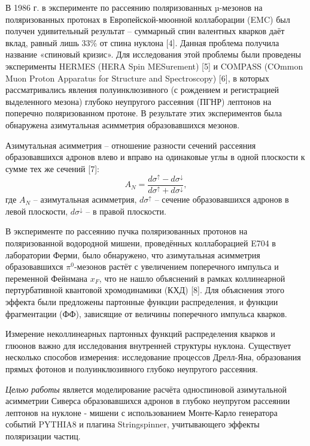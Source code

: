 \documentclass{extarticle}
\begin{document}
В 1986 г. в эксперименте по рассеянию поляризованных µ-мезонов на поляризованных протонах в Европейской-мюонной коллаборации (EMC) был получен удивительный результат – суммарный спин валентных кварков даёт вклад, равный лишь 33\% от спина нуклона [4]. Данная проблема получила название «спиновый кризис». Для исследования этой проблемы были проведены эксперименты HERMES (HERA Spin MESurement) [5] и COMPASS (COmmon Muon Proton Apparatus for Structure and Spectroscopy) [6], в которых рассматривались явления полуинклюзивного (с рождением и регистрацией выделенного мезона) глубоко неупругого рассеяния (ПГНР) лептонов на поперечно поляризованном протоне. В результате этих экспериментов была обнаружена азимутальная асимметрия образовавшихся мезонов.


Азимутальная асимметрия – отношение разности сечений рассеяния образовавшихся адронов влево и вправо на одинаковые углы в одной плоскости к сумме тех же сечений [7]:
\begin{equation}
    A_N =\frac{d\sigma^\uparrow -d\sigma^\downarrow }{d\sigma^\uparrow +d\sigma^\downarrow },
\end{equation} 
где $A_N$ -- азимутальная асимметрия, $d\sigma^\uparrow$  – сечение образовавшихся адронов в левой плоскости, $d\sigma^\downarrow$  – в правой плоскости.


 В эксперименте по рассеянию пучка поляризованных протонов на поляризованной водородной мишени, проведённых коллаборацией E704 в лаборатории Ферми, было обнаружено, что азимутальная асимметрия образовавшихся $\pi^0$-мезонов растёт с увеличением поперечного импульса и переменной Фейнмана $x_F$, что не нашло объяснений в рамках коллинеарной пертурбативной квантовой хромодинамики (КХД) [8]. Для объяснения этого эффекта были предложены партонные функции распределения, и функции фрагментации (ФФ), зависящие от величины поперечного импульса кварков.

 
 Измерение неколлинеарных партонных функций распределения кварков и глюонов важно для исследования внутренней структуры нуклона. Существует несколько способов измерения: исследование процессов Дрелл-Яна, образования прямых фотонов и полуинклюзивного глубоко неупругого рассеяния. 

\textit{Целью работы} является моделирование расчёта односпиновой азимутальной асимметрии Сиверса образовавшихся адронов в глубоко неупругом рассеянии лептонов на нуклоне - мишени с использованием Монте-Карло генератора событий PYTHIA8 и плагина Stringspinner, учитывающего эффекты поляризации частиц. 
\end{document}
